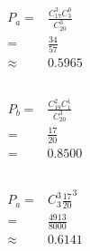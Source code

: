\documentclass{article}
\begin{document}
    \section{}
        \subsection{}
            \subsubsection{}
                \begin{equation*}
                    \begin{split}
                        P_a=&\frac{C_{17}^3C_3^0}{C_{20}^3}\\
                            =&\frac{34}{57}\\
                            \approx&0.5965\\
                    \end{split}
                \end{equation*}
            \subsubsection{}
                \begin{equation*}
                    \begin{split}
                        P_b=&\frac{C_{19}^2C_1^1}{C_{20}^3}\\
                            =&\frac{17}{20}\\
                            =&0.8500
                    \end{split}
                \end{equation*}
        \subsection{}
            \subsubsection{}
                \begin{equation*}
                    \begin{split}
                        P_a=&C_3^3\frac{17}{20}^3\\
                            =&\frac{4913}{8000}\\
                            \approx&0.6141\\
                    \end{split}
                \end{equation*}
\end{document}
